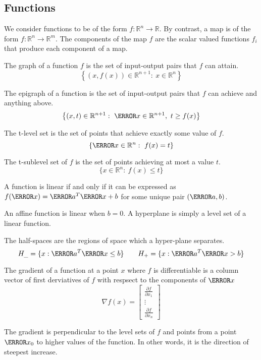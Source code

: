 \subsection{Functions}
We consider functions to be of the form $f:\mathbb{R}^n\rightarrow\mathbb{R}$.
By contrast, a map is of the form $f:\mathbb{R}^n\rightarrow\mathbb{R}^m$.
The components of the map $f$ are the scalar valued functions $f_i$ that produce each component of a map.
\begin{definition}
  The graph of a function $f$ is the set of input-output pairs that $f$ can attain.
  \[
	\left\{ (x, f(x))\in \mathbb{R}^{n+1}:\ x\in\mathbb{R}^n \right\}
  \]
  \label{defn:graph}
\end{definition}
\begin{definition}
  The epigraph of a function is the set of input-output pairs that $f$ can achieve and anything above.
  \[
	\left\{ (x,t) \in \mathbb{R}^{n+1}:\ \V{x}\in\mathbb{R}^{n+1},\ t\geq f(x) \right\}
  \]
  \label{defn:epigraph}
\end{definition}
\begin{definition}
  The t-level set is the set of points that achieve exactly some value of $f$.
  \[
	\{ \V{x}\in\mathbb{R}^n:\ f(x)=t \}
  \]
  \label{defn:level-set}
\end{definition}
\begin{definition}
  The t-sublevel set of $f$ is the set of points achieving at most a value $t$.
  \[
	\{ x\in\mathbb{R}^n:\ f(x)\leq t \}
  \]
  \label{defn:sublevel-set}
\end{definition}
\begin{theorem}
  A function is linear if and only if it can be expressed as $f(\V{x}) = \V{a}^T\V{x}+b$ for some unique pair $(\V{a}, b)$.
  \label{thm:linear-ip}
\end{theorem}
An affine function is linear when $b=0$. A hyperplane is simply a level set of a linear function.
\begin{definition}
  The half-spaces are the regions of space which a hyper-plane separates.
  \[
	H_{\_} = \{ x: \V{a}^T\V{x}\leq b \} \qquad H_{+} = \{ x: \V{a}^T\V{x} > b \}
  \]
  \label{defn:halfspace}
\end{definition}
\begin{definition}
  The gradient of a function at a point $x$ where $f$ is differentiable is a column vector of first derviatives of $f$ with respsect to the components of $\V{x}$
  \[
	\nabla f(x) = \begin{bmatrix}
	  \frac{\partial f}{\partial x_1}\\
	  \vdots\\
	  \frac{\partial f}{\partial x_n}
	\end{bmatrix}
  \]
  \label{defn:gradient}
\end{definition}
The gradient is perpendicular to the level sets of $f$ and points from a point $\V{x}_0$ to higher values of the function.
In other words, it is the direction of steepest increase.
